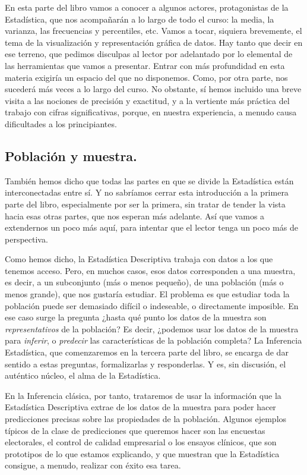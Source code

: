 En esta parte del libro vamos a conocer a algunos actores, protagonistas de la Estadística, que nos
acompañarán a lo largo de todo el curso: la media, la varianza, las frecuencias y percentiles, etc.
Vamos a tocar, siquiera brevemente, el tema de la visualización y representación gráfica de datos.
Hay tanto que decir en ese terreno, que pedimos disculpas al lector por adelantado por lo elemental
de las herramientas que vamos a presentar. Entrar con más profundidad en esta materia exigiría un
espacio del que no disponemos. Como, por  otra parte, nos sucederá más veces a lo largo del curso.
No obstante, sí hemos incluido una breve visita a las nociones de precisión y exactitud, y a la
vertiente más práctica del trabajo con cifras significativas, porque, en nuestra experiencia, a
menudo causa dificultades a los principiantes.

\subsection*{Población y muestra.}

También hemos dicho que todas las partes en que se divide la Estadística están interconectadas
entre sí. Y no sabríamos cerrar esta introducción a la primera parte del libro, especialmente por
ser la primera, sin tratar de tender la vista hacia esas otras partes, que nos esperan más
adelante. Así que vamos a extendernos un poco más aquí, para intentar que el lector tenga un poco
más de perspectiva.

Como hemos dicho, la Estadística Descriptiva trabaja con datos a los que tenemos acceso. Pero, en
muchos casos, esos datos corresponden a una  {\sf muestra}, es decir, a un
subconjunto (más o  menos pequeño), de una  {\sf población} (más o menos grande),
que nos gustaría estudiar. El problema es que estudiar toda la población puede ser demasiado
difícil o indeseable, o directamente imposible. En ese caso surge la pregunta ¿hasta qué punto los
datos de la muestra son {\em representativos} de la población? Es decir, ¿podemos usar los datos de
la muestra para {\em inferir}, o {\em predecir} las características de la población completa? La
 {\sf Inferencia Estadística}, que comenzaremos en la tercera parte del
libro, se encarga de dar sentido a estas preguntas, formalizarlas y responderlas. Y es, sin
discusión, el auténtico núcleo, el alma de la Estadística.

En la Inferencia clásica, por tanto, trataremos de usar la información que la Estadística
Descriptiva extrae de los datos de la muestra para poder hacer predicciones precisas sobre las
propiedades de la población. Algunos ejemplos típicos de la clase de predicciones que queremos hacer son las encuestas electorales, el control de calidad empresarial o los ensayos clínicos, que son prototipos de lo que estamos explicando, y que muestran que la Estadística consigue, a menudo, realizar con éxito esa tarea.

